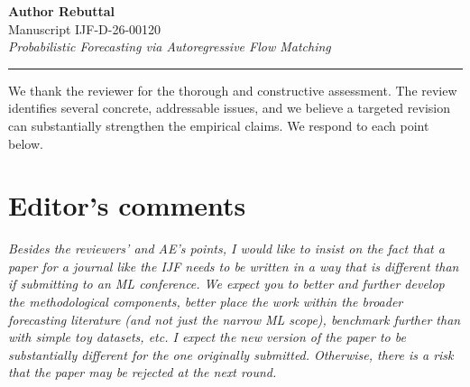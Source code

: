 \documentclass[11pt]{article}
\newcommand{\reviewertext}[1]{%
  \begin{reviewerquote}
    {\color{reviewercolor}\itshape #1}
  \end{reviewerquote}%
}
\begin{document}
\begin{center}
  {\LARGE \textbf{Author Rebuttal}}\\[6pt]
  {\large Manuscript IJF-D-26-00120}\\[4pt]
  {\large \textit{Probabilistic Forecasting via Autoregressive Flow Matching}}\\[4pt]
  \rule{\linewidth}{0.4pt}
\end{center}

\vspace{4pt}

We thank the reviewer for the thorough and constructive assessment. The review identifies several concrete, addressable issues, and we believe a targeted revision can substantially strengthen the empirical claims. We respond to each point below.

\vspace{8pt}


\section{Editor's comments}

\reviewertext{%
Besides the reviewers' and AE's points, I would like to insist on the fact that a paper for a journal like the IJF needs to be written in a way that is different than if submitting to an ML conference. We expect you to better and further develop the methodological components, better place the work within the broader forecasting literature (and not just the narrow ML scope), benchmark further than with simple toy datasets, etc. I expect the new version of the paper to be substantially different for the one originally submitted. Otherwise, there is a risk that the paper may be rejected at the next round.
}
\end{document}
